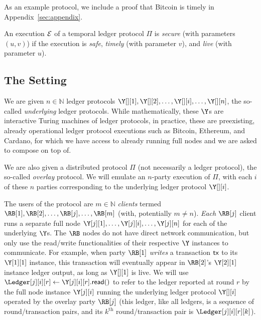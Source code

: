 \iflong
As an example protocol, we include a proof that Bitcoin is timely in
Appendix~\ref{sec:appendix}.
\fi

\begin{definition}
  An execution $\mathcal{E}$ of a temporal ledger protocol $\Pi$ is \emph{secure} (with parameters $(u, v)$) if the execution
  is \emph{safe}, \emph{timely} (with parameter $v$), and \emph{live} (with parameter $u$).
\end{definition}

\subsection{The Setting}

We are given $n \in \mathbb{N}$ ledger protocols
$\Y[][1], \Y[][2], \ldots, \Y[][i], \ldots, \Y[][n]$,
the so-called \emph{underlying} ledger protocols.
While mathematically, these $\Y$s are interactive Turing machines of ledger protocols,
in practice, these are preexisting, already operational ledger protocol executions
such as Bitcoin, Ethereum, and Cardano, for which we have access to already running full nodes
and we are asked to compose on top of.

We are also given a distributed protocol $\Pi$ (not necessarily a ledger protocol),
the so-called \emph{overlay} protocol. We will emulate an $n$-party execution of $\Pi$,
with each $i$ of these $n$ parties corresponding to the underlying ledger protocol $\Y[][i]$.

The users of the protocol are $m \in \mathbb{N}$ \rollerblade \emph{clients} termed
$\RB[1], \RB[2], \ldots, \RB[j], \ldots, \RB[m]$ (with, potentially $m \neq n$).
\emph{Each} $\RB[j]$ client runs a separate full node $\Y[j][1], \ldots, \Y[j][i], \ldots, \Y[j][n]$
for each of the underlying $\Y$s. The $\RB$ nodes do not have direct network communication, but only
use the read/write functionalities of their respective $\Y$ instances to communicate.
For example, when party $\RB[1]$ \emph{writes} a transaction $\textsf{tx}$ to its $\Y[1][1]$ instance,
this transaction will eventually appear in $\RB[2]$'s $\Y[2][1]$ instance ledger output,
as long as $\Y[][1]$ is live.
We will use $\Ledger[j][i][r] \gets \Y[j][i][r].\lread()$ to refer to the ledger reported at
round $r$ by the full node instance $\Y[j][i]$ running the underlying ledger protocol $\Y[][i]$
operated by the overlay party $\RB[j]$
(this ledger, like all ledgers, is a sequence of round/transaction pairs, and its
$k^\text{th}$ round/transaction pair is $\Ledger[j][i][r][k]$).

